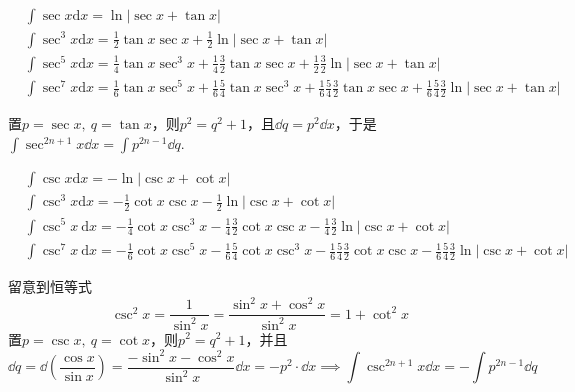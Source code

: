 \begin{theorem}
\vspace{-15pt}
\begin{align*}&\int\sec x\mathrm{d}x=\ln|\sec x+\tan x|\\&\int\sec^{3}x\mathrm{d}x=\frac{1}{2}\tan x\sec x+\frac{1}{2}\ln|\sec x+\tan x|\\&\int\sec^{5}x\mathrm{d}x=\frac{1}{4}\tan x\sec^{3}x+\frac{1}{4}\frac{3}{2}\tan x\sec x+\frac{1}{2}\frac{3}{2}\ln|\sec x+\tan x|\\&\int\sec^{7}x\mathrm{d}x=\frac{1}{6}\tan x\sec^{5}x+\frac{1}{6}\frac{5}{4}\tan x\sec^{3}x+\frac{1}{6}\frac{5}{4}\frac{3}{2}\tan x\sec x+\frac{1}{6}\frac{5}{4}\frac{3}{2}\ln|\sec x+\tan x|\end{align*}
\end{theorem}
置$p=\sec x,\ q=\tan x$，则$p^{2}=q^{2}+1$，且$\dd q=p^{2}\dd x$，于是$\displaystyle\int\sec^{2n+1}x\dd x=\int p^{2n-1}\dd q$.

\begin{theorem}
\vspace{-15pt}
\begin{align*}&\int\csc x\mathrm{d}x=-\ln|\csc x+\cot x|\\&\int\csc^3x\mathrm{d}x=-\frac{1}{2}\cot x\csc x-\frac{1}{2}\ln|\csc x+\cot x|\\&\int\csc^5x\mathrm{~d}x=-\frac{1}{4}\cot x\csc^3x-\frac{1}{4}\frac{3}{2}\cot x\csc x-\frac{1}{4}\frac{3}{2}\ln|\csc x+\cot x|\\&\int\csc^7x\mathrm{~d}x=-\frac{1}{6}\cot x\csc^5x-\frac{1}{6}\frac{5}{4}\cot x\csc^3x-\frac{1}{6}\frac{5}{4}\frac{3}{2}\cot x\csc x-\frac{1}{6}\frac{5}{4}\frac{3}{2}\ln|\csc x+\cot x|\end{align*}
\end{theorem}
留意到恒等式\[\csc^{2}x=\frac{1}{\sin^{2}x}=\frac{\sin^{2}x+\cos^{2}x}{\sin^{2}x}=1+\cot^{2}x\]
置$p=\csc x,\ q=\cot x$，则$p^{2}=q^{2}+1$，并且\[\dd q=\dd\left(\frac{\cos x}{\sin x}\right)=\frac{-\sin^{2}x-\cos^{2}x}{\sin^{2}x}\dd x=-p^{2}\cdot \dd x\implies\int\csc^{2n+1}x\dd x=-\int p^{2n-1}\dd q\]

